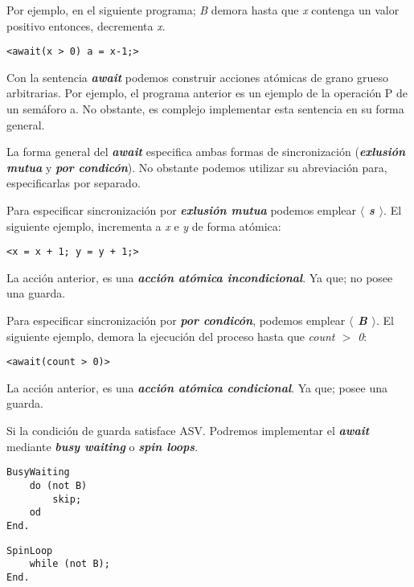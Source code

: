 \documentclass[a4paper, 10pt]{report}
\begin{document}
Por ejemplo, en el siguiente programa; \emph{B} demora hasta que \emph{x} contenga un valor positivo entonces, decrementa \emph{x}.

\begin{lstlisting}
<await(x > 0) a = x-1;>
\end{lstlisting}

Con la sentencia \textbf{\emph{await}} podemos construir acciones atómicas de grano grueso arbitrarias. Por ejemplo, el programa anterior es un ejemplo de la operación P de un semáforo a. No obstante, es complejo implementar esta sentencia en su forma general.

La forma general del \textbf{\emph{await}} especifica ambas formas de sincronización (\textbf{\emph{exlusión mutua}} y \textbf{\emph{por condicón}}). No obstante podemos utilizar su abreviación para, especificarlas por separado.

Para especificar sincronización por \textbf{\emph{exlusión mutua}} podemos emplear \textbf{\emph{$\langle$ s $\rangle$}}. El siguiente ejemplo, incrementa a \emph{x} e \emph{y} de forma atómica:

\begin{lstlisting}
<x = x + 1; y = y + 1;>
\end{lstlisting}

La acción anterior, es una \textbf{\emph{acción atómica incondicional}}. Ya que; no posee una guarda.

Para especificar sincronización por \textbf{\emph{por condicón}}, podemos emplear \textbf{\emph{$\langle$ B $\rangle$}}. El siguiente ejemplo, demora la ejecución del proceso hasta que \emph{count $>$ 0}:

\begin{lstlisting}
<await(count > 0)>
\end{lstlisting}
	

La acción anterior, es una \textbf{\emph{acción atómica condicional}}. Ya que; posee una guarda.

Si la condición de guarda satisface ASV. Podremos implementar el \textbf{\emph{await}} mediante \textbf{\emph{busy waiting}} o \textbf{\emph{spin loops}}.

\noindent
\begin{minipage}{0.5\textwidth}
\begin{lstlisting}
BusyWaiting
	do (not B)
		skip;
	od
End.
\end{lstlisting}
\end{minipage}
\noindent
\begin{minipage}{0.5\textwidth}
\begin{lstlisting}
SpinLoop
	while (not B);
End.
\end{lstlisting}
\end{minipage}
\end{document}
